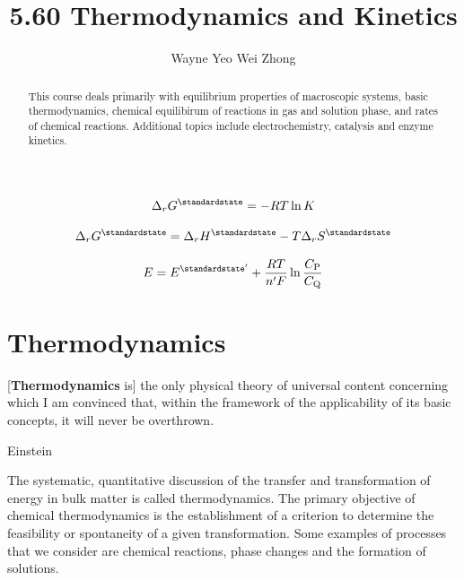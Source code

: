 \documentclass{article}
\title{5.60 Thermodynamics and Kinetics}
\author{Wayne Yeo Wei Zhong}
\numberwithin{theorem}{section}
\numberwithin{corollary}{section}
\numberwithin{postulate}{section}
\numberwithin{lemma}{section}
\numberwithin{definition}{section}
\begin{document}
\maketitle

\begin{abstract}
  This course deals primarily with equilibrium properties of macroscopic
  systems, basic thermodynamics, chemical equilibirum of reactions in gas and
  solution phase, and rates of chemical reactions. Additional topics include
  electrochemistry, catalysis and enzyme kinetics.
\end{abstract}

\tableofcontents

\newpage

\section*{}
\bigskip

\begin{equation*}
  \Delta_r G^{\standardstate} = -RT\ln{K}
\end{equation*}

\begin{equation*}
\Delta_r G^{\standardstate} = \Delta_r H^{\standardstate} - T \Delta_r S^{\standardstate}
\end{equation*}

\begin{equation*}
  E = E^{\standardstate'} + \frac{RT}{n'F} \ln{\frac{C_\mathrm{P}}{C_\mathrm{Q}}}
\end{equation*}
\newpage

\part{Thermodynamics}

\epigraph{[\textbf{Thermodynamics} is] the only physical theory of universal
content concerning which I am convinced that, within the framework of the
applicability of its basic concepts, it will never be overthrown.}{Einstein}

The systematic, quantitative discussion of the transfer and transformation of
energy in bulk matter is called thermodynamics. The primary objective of
chemical thermodynamics is the establishment of a criterion to determine the
feasibility or spontaneity of a given transformation. Some examples of processes
that we consider are chemical reactions, phase changes and the formation of
solutions. 
\end{document}
